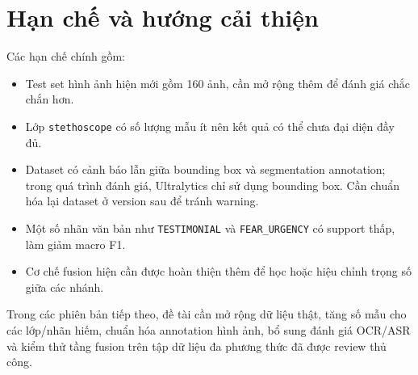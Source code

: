 \section{Hạn chế và hướng cải thiện}
Các hạn chế chính gồm:
\begin{itemize}
    \item Test set hình ảnh hiện mới gồm 160 ảnh, cần mở rộng thêm để đánh giá chắc chắn hơn.
    \item Lớp \texttt{stethoscope} có số lượng mẫu ít nên kết quả có thể chưa đại diện đầy đủ.
    \item Dataset có cảnh báo lẫn giữa bounding box và segmentation annotation; trong quá trình đánh giá, Ultralytics chỉ sử dụng bounding box. Cần chuẩn hóa lại dataset ở version sau để tránh warning.
    \item Một số nhãn văn bản như \texttt{TESTIMONIAL} và \texttt{FEAR\_URGENCY} có support thấp, làm giảm macro F1.
    \item Cơ chế fusion hiện cần được hoàn thiện thêm để học hoặc hiệu chỉnh trọng số giữa các nhánh.
\end{itemize}

Trong các phiên bản tiếp theo, đề tài cần mở rộng dữ liệu thật, tăng số mẫu cho các lớp/nhãn hiếm, chuẩn hóa annotation hình ảnh, bổ sung đánh giá OCR/ASR và kiểm thử tầng fusion trên tập dữ liệu đa phương thức đã được review thủ công.

